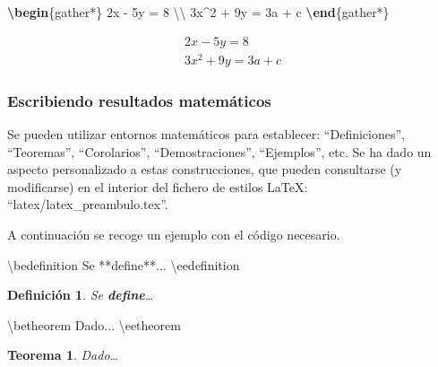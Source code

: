 \documentclass[12pt,a4paper,oneside,]{article}
\newenvironment{Shaded}{\begin{snugshade}}{\end{snugshade}}
\newcommand{\ExtensionTok}[1]{#1}
\newcommand{\KeywordTok}[1]{\textcolor[rgb]{0.13,0.29,0.53}{\textbf{#1}}}
\newcommand{\NormalTok}[1]{#1}
\newcommand{\SpecialCharTok}[1]{\textcolor[rgb]{0.00,0.00,0.00}{#1}}
\newcommand{\SpecialStringTok}[1]{\textcolor[rgb]{0.31,0.60,0.02}{#1}}
\newcounter{dummy}
\numberwithin{dummy}{section}
\theoremstyle{ocrenumbox}
\newtheorem{theoremeT}[dummy]{Teorema}  %
\theoremstyle{blacknumex}
\theoremstyle{blacknumbox}
\newtheorem{definitionT}{Definición}[section]  %
\theoremstyle{ocrenum}
\newenvironment{theorem}{\begin{tBox}\begin{theoremeT}}{\end{theoremeT}\end{tBox}}
\newenvironment{definition}{\begin{dBox}\begin{definitionT}}{\end{definitionT}\end{dBox}}
\theoremstyle{ocrenum}
\newcommand{\betheorem}{\begin{theorem}}
\newcommand{\eetheorem}{\end{theorem}}
\newcommand{\bedefinition}{\begin{definition}}
\newcommand{\eedefinition}{\end{definition}}
\begin{document}
\begin{Shaded}
\begin{Highlighting}[]
\KeywordTok{\textbackslash{}begin}\NormalTok{\{}\ExtensionTok{gather*}\NormalTok{\}}\SpecialStringTok{ }
\SpecialStringTok{2x {-} 5y =  8 }\SpecialCharTok{\textbackslash{}\textbackslash{}}\SpecialStringTok{ }
\SpecialStringTok{3x\^{}2 + 9y =  3a + c}
\KeywordTok{\textbackslash{}end}\NormalTok{\{}\ExtensionTok{gather*}\NormalTok{\}}
\end{Highlighting}
\end{Shaded}

\begin{gather*} 
2x - 5y =  8 \\ 
3x^2 + 9y =  3a + c
\end{gather*}

\hypertarget{escribiendo-resultados-matemuxe1ticos}{%
\subsubsection{Escribiendo resultados
matemáticos}\label{escribiendo-resultados-matemuxe1ticos}}

Se pueden utilizar entornos matemáticos para establecer:
``Definiciones'', ``Teoremas'', ``Corolarios'', ``Demostraciones'',
``Ejemplos'', etc. Se ha dado un aspecto personalizado a estas
construcciones, que pueden consultarse (y modificarse) en el interior
del fichero de estilos LaTeX: ``latex/latex\_preambulo.tex''.

A continuación se recoge un ejemplo con el código necesario.

\begin{Shaded}
\begin{Highlighting}[]
\NormalTok{\textbackslash{}bedefinition}
\NormalTok{Se **define**... }
\NormalTok{\textbackslash{}eedefinition}
\end{Highlighting}
\end{Shaded}

\bedefinition

Se \textbf{define}\ldots{} \eedefinition

\begin{Shaded}
\begin{Highlighting}[]
\NormalTok{\textbackslash{}betheorem}
\NormalTok{Dado...}
\NormalTok{\textbackslash{}eetheorem}
\end{Highlighting}
\end{Shaded}

\betheorem

Dado\ldots{} \eetheorem
\end{document}
